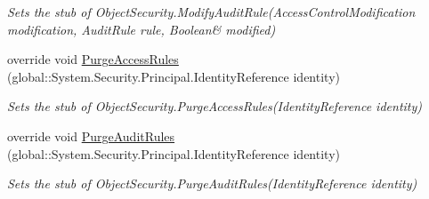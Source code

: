 \begin{DoxyCompactItemize}
\begin{DoxyCompactList}\small\item\em Sets the stub of Object\-Security.\-Modify\-Audit\-Rule(Access\-Control\-Modification modification, Audit\-Rule rule, Boolean\& modified)\end{DoxyCompactList}\item 
override void \hyperlink{class_system_1_1_security_1_1_access_control_1_1_fakes_1_1_stub_native_object_security_afbbd630ef965ead025fbcda81d4b1f49}{Purge\-Access\-Rules} (global\-::\-System.\-Security.\-Principal.\-Identity\-Reference identity)
\begin{DoxyCompactList}\small\item\em Sets the stub of Object\-Security.\-Purge\-Access\-Rules(\-Identity\-Reference identity)\end{DoxyCompactList}\item 
override void \hyperlink{class_system_1_1_security_1_1_access_control_1_1_fakes_1_1_stub_native_object_security_a4b7669a1e84a58bf4f3adee6c40d3744}{Purge\-Audit\-Rules} (global\-::\-System.\-Security.\-Principal.\-Identity\-Reference identity)
\begin{DoxyCompactList}\small\item\em Sets the stub of Object\-Security.\-Purge\-Audit\-Rules(\-Identity\-Reference identity)\end{DoxyCompactList}\end{DoxyCompactItemize}
